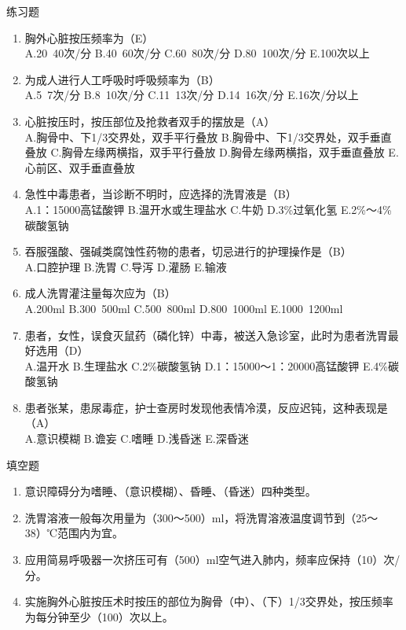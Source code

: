 \documentclass[11pt, a4paper]{ctexart}
\begin{document}
\begin{examplebox}{练习题}
\begin{enumerate}
    \item 胸外心脏按压频率为（E）\\
    A.20~40次/分 \quad B.40~60次/分 \quad C.60~80次/分 \quad D.80~100次/分 \quad E.100次以上
    \item 为成人进行人工呼吸时呼吸频率为（B）\\
    A.5~7次/分 \quad B.8~10次/分 \quad C.11~13次/分 \quad D.14~16次/分 \quad E.16次/分以上
    \item 心脏按压时，按压部位及抢救者双手的摆放是（A）\\
    A.胸骨中、下1/3交界处，双手平行叠放 \quad B.胸骨中、下1/3交界处，双手垂直叠放 \quad C.胸骨左缘两横指，双手平行叠放 \quad D.胸骨左缘两横指，双手垂直叠放 \quad E.心前区、双手垂直叠放
    \item 急性中毒患者，当诊断不明时，应选择的洗胃液是（B）\\
    A.1：15000高锰酸钾 \quad B.温开水或生理盐水 \quad C.牛奶 \quad D.3\%过氧化氢 \quad E.2\%～4\%碳酸氢钠
    \item 吞服强酸、强碱类腐蚀性药物的患者，切忌进行的护理操作是（B）\\
    A.口腔护理 \quad B.洗胃 \quad C.导泻 \quad D.灌肠 \quad E.输液
    \item 成人洗胃灌注量每次应为（B）\\
    A.200ml \quad B.300~500ml \quad C.500~800ml \quad D.800~1000ml \quad E.1000~1200ml
    \item 患者，女性，误食灭鼠药（磷化锌）中毒，被送入急诊室，此时为患者洗胃最好选用（D）\\
    A.温开水 \quad B.生理盐水 \quad C.2\%碳酸氢钠 \quad D.1：15000～1：20000高锰酸钾 \quad E.4\%碳酸氢钠
    \item 患者张某，患尿毒症，护士查房时发现他表情冷漠，反应迟钝，这种表现是（A）\\
    A.意识模糊 \quad B.谵妄 \quad C.嗜睡 \quad D.浅昏迷 \quad E.深昏迷
\end{enumerate}
\end{examplebox}

\begin{tipsbox}{填空题}
\begin{enumerate}
    \item 意识障碍分为嗜睡、（意识模糊）、昏睡、（昏迷）四种类型。
    \item 洗胃溶液一般每次用量为（300～500）ml，将洗胃溶液温度调节到（25～38）℃范围内为宜。
    \item 应用简易呼吸器一次挤压可有（500）ml空气进入肺内，频率应保持（10）次/分。
    \item 实施胸外心脏按压术时按压的部位为胸骨（中）、（下）1/3交界处，按压频率为每分钟至少（100）次以上。
\end{enumerate}
\end{tipsbox}
\end{document}
